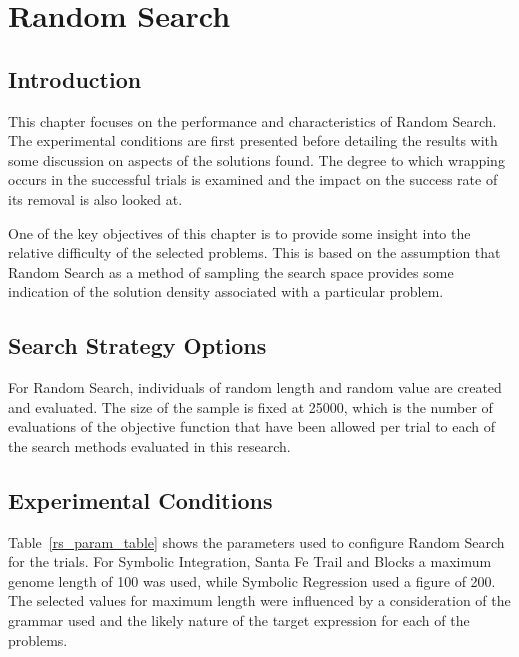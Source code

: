 \chapter{Random Search}
\section{Introduction}
This chapter focuses on the performance and characteristics of Random Search. The experimental conditions are first presented before detailing  the results with some discussion on aspects of the solutions found. The degree to which wrapping occurs in the successful trials is examined and the impact on the success rate of its removal is also looked at. 

One of the key objectives of this chapter is to provide some insight into the relative difficulty of the selected problems. This is based on the assumption that Random Search as a method of sampling the search space provides some indication of the solution density associated with a particular problem.


\section{Search Strategy Options}
For Random Search, individuals of random length and random value are created and evaluated. The size of the sample is fixed at 25000, which is the number of evaluations of the objective function that have been allowed per trial to each of the search methods evaluated in this research. 

\section{Experimental Conditions}

Table~\ref{rs_param_table} shows the parameters used to configure Random Search for the trials.
For Symbolic Integration, Santa Fe Trail and Blocks a maximum genome length of 100 was used, while Symbolic Regression used a figure of 200. The selected values for maximum length were influenced by a consideration of the grammar used and the likely nature of the target expression for each of the problems. 


